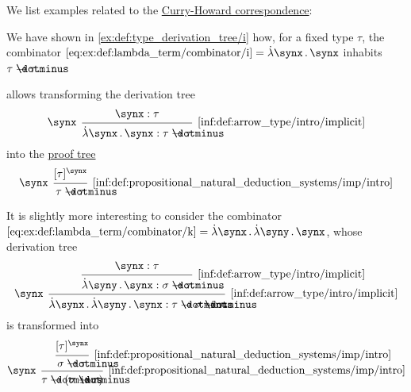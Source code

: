 \begin{example}\label{ex:con:curry_howard_correspondence}
  We list examples related to the \hyperref[con:curry_howard_correspondence]{Curry-Howard correspondence}:
  \begin{thmenum}
     We have shown in \cref{ex:def:type_derivation_tree/i} how, for a fixed type \( \tau \), the combinator \( \ref{eq:ex:def:lambda_term/combinator/i} = \qabs \synx \synx \) inhabits \( \tau \synimplies \tau \).

     allows transforming the derivation tree
    \begin{equation*}
      \begin{prooftree}
        \hypo{ \synx: \tau }
        \infer[left label=\( \synx \)]1[\ref{inf:def:arrow_type/intro/implicit}]{ \qabs \synx \synx: \tau \synimplies \tau }
      \end{prooftree}
    \end{equation*}
    into the \hyperref[def:natural_deduction_proof_tree]{proof tree}
    \begin{equation*}
      \begin{prooftree}
        \hypo{ [\tau]^\synx }
        \infer[left label=\( \synx \)]1[\ref{inf:def:propositional_natural_deduction_systems/imp/intro}]{ \tau \synimplies \tau }
      \end{prooftree}
    \end{equation*}

    It is slightly more interesting to consider the combinator \( \ref{eq:ex:def:lambda_term/combinator/k} = \qabs \synx \qabs \syny \synx \), whose derivation tree
    \begin{equation*}
      \begin{prooftree}
        \hypo{ \synx: \tau }
        \infer1[\ref{inf:def:arrow_type/intro/implicit}]{ \qabs \syny \synx: \sigma \synimplies \tau }
        \infer[left label=\( \synx \)]1[\ref{inf:def:arrow_type/intro/implicit}]{ \qabs \synx \qabs \syny \synx: \tau \synimplies \sigma \synimplies \tau }
      \end{prooftree}
    \end{equation*}
    is transformed into
    \begin{equation*}
      \begin{prooftree}
        \hypo{ [\tau]^\synx }
        \infer1[\ref{inf:def:propositional_natural_deduction_systems/imp/intro}]{ \sigma \synimplies \tau }
        \infer[left label=\( \synx \)]1[\ref{inf:def:propositional_natural_deduction_systems/imp/intro}]{ \tau \synimplies (\sigma \synimplies \tau) }
      \end{prooftree}
    \end{equation*}


\end{thmenum}
\end{example}

